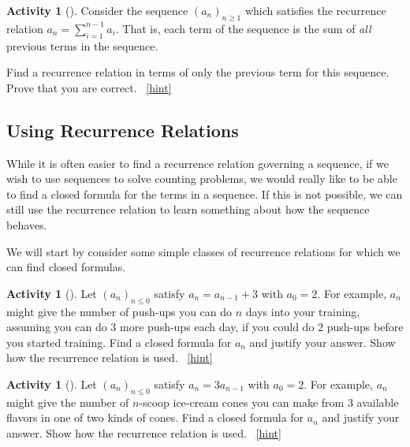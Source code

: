 \documentclass[10pt,]{book}
\theoremstyle{plain}
\theoremstyle{definition}
\theoremstyle{definition}
\theoremstyle{definition}
\newtheorem{activity}[project]{Activity}
\numberwithin{equation}{chapter}
\begin{document}
\begin{activity}[]\label{activity-80}
\hypertarget{p-487}{}%
Consider the sequence \((a_n)_{n \ge 1}\) which satisfies the recurrence relation \(a_n = \sum_{i = 1}^{n-1} a_i\).  That is, each term of the sequence is the sum of \emph{all} previous terms in the sequence.%
\par
\hypertarget{p-488}{}%
Find a recurrence relation in terms of only the previous term for this sequence.  Prove that you are correct.%
~\hfill{\tiny\hyperlink{a-80}{[hint]}\hypertarget{q-80}{}}\end{activity}
\typeout{************************************************}
\typeout{************************************************}
\subsection[{Using Recurrence Relations}]{Using Recurrence Relations}\label{subsec-recursionclosed}
\hypertarget{p-490}{}%
While it is often easier to find a recurrence relation governing a sequence, if we wish to use sequences to solve counting problems, we would really like to be able to find a closed formula for the terms in a sequence. If this is not possible, we can still use the recurrence relation to learn something about how the sequence behaves.%
\par
\hypertarget{p-491}{}%
We will start by consider some simple classes of recurrence relations for which we can find closed formulas.%
\begin{activity}[]\label{act-arithmetic}
\hypertarget{p-492}{}%
Let \((a_n)_{n \le 0}\) satisfy \(a_n = a_{n-1} + 3\) with \(a_0 = 2\).  For example, \(a_n\) might give the number of push-ups you can do \(n\) days into your training, assuming you can do 3 more push-ups each day, if you could do 2 push-ups before you started training.  Find a closed formula for \(a_n\) and justify your answer.  Show how the recurrence relation is used.%
~\hfill{\tiny\hyperlink{a-81}{[hint]}\hypertarget{q-81}{}}\end{activity}
\begin{activity}[]\label{act-geometric}
\hypertarget{p-494}{}%
Let \((a_n)_{n \le 0}\) satisfy \(a_n = 3a_{n-1}\) with \(a_0 = 2\).  For example, \(a_n\) might give the number of \(n\)-scoop ice-cream cones you can make from 3 available flavors in one of two kinds of cones.  Find a closed formula for \(a_n\) and justify your answer.  Show how the recurrence relation is used.%
~\hfill{\tiny\hyperlink{a-82}{[hint]}\hypertarget{q-82}{}}\end{activity}
\end{document}
